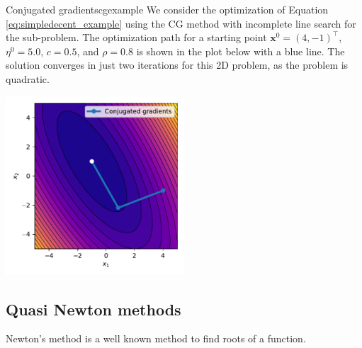 \begin{example}{Conjugated gradients}{cgexample}
    We consider the optimization of Equation \eqref{eq:simpledecent_example} using the CG method with incomplete line search for the sub-problem. The optimization path for a starting point $\mathbf{x}^0= (4, -1)^\top$, $\eta^0=5.0$, $c=0.5$, and $\rho=0.8$ is shown in the plot below with a blue line. The solution converges in just two iterations for this 2D problem, as the problem is quadratic.
    \begin{center}
        \includegraphics[width=0.5\textwidth]{figures/cg.pdf}
    \end{center}   
\end{example}

\subsection{Quasi Newton methods}
Newton's method is a well known method to find roots of a function. 

